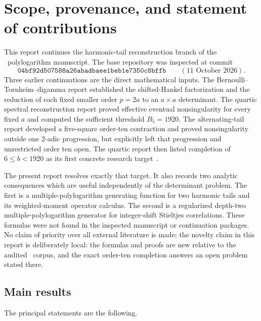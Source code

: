 \section{Scope, provenance, and statement of contributions}
\label{sec:scope}

This report continues the harmonic-tail reconstruction branch of the
\Repo\ polylogarithm manuscript.  The base repository was inspected at
commit~\cite{Repo}
\[
 \texttt{04bf92d507588a26abadbaee1beb1e7350c8bffb}
 \qquad (11\text{ October }2026).
\]
Three earlier continuations are the direct mathematical inputs.
The Bernoulli--Tornheim--digamma report established the shifted-Hankel
factorization and the reduction of each fixed smaller order $p=2a$ to
an $a\times a$ determinant.  The quartic spectral reconstruction
report proved effective eventual nonsingularity for every fixed $a$ and
computed the sufficient threshold $B_5=1920$.  The alternating-tail
report developed a five-square order-ten contraction and proved
nonsingularity outside one $2$-adic progression, but explicitly left
that progression and unrestricted order ten open.  The quartic report
then listed completion of $6\le b<1920$ as its first concrete research
target~\cite{BTD,QSR,ATSD}.

The present report resolves exactly that target.  It also records two
analytic consequences which are useful independently of the determinant
problem.  The first is a multiple-polylogarithm generating function for
two harmonic tails and its weighted-moment operator calculus.  The
second is a regularized depth-two multiple-polylogarithm generator for
integer-shift Stieltjes correlations.  These formulas were not found in
the inspected manuscript or continuation packages.  No claim of
priority over all external literature is made; the novelty claim in this
report is deliberately local: the formulas and proofs are new relative
to the audited \Repo\ corpus, and the exact order-ten completion answers
an open problem stated there.

\subsection{Main results}

The principal statements are the following.

